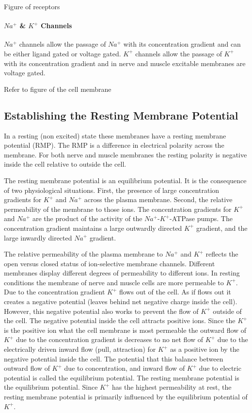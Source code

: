 Figure of receptors

\paragraph{$Na^+$ \& $K^+$ Channels}

$Na^+$ channels allow the passage of $Na^+$ with its concentration gradient and can be either ligand gated or voltage gated. $K^+$ channels allow the passage of $K^+$ with its concentration gradient and in nerve and muscle excitable membranes are voltage gated. 

Refer to figure of the cell membrane

\subsection{Establishing the Resting Membrane Potential}

In a resting (non excited) state these membranes have a resting membrane potential (RMP). The RMP is a difference in electrical polarity across the membrane. For both nerve and muscle membranes the resting polarity is negative inside the cell relative to outside the cell. 


The resting membrane potential is an equilibrium potential. It is the consequence of two physiological situations. First, the presence of large concentration gradients for $K^+$ and $Na^+$ across the plasma membrane. Second, the relative permeability of the membrane to those ions. The concentration gradients for $K^+$ and $Na^+$ are the product of the activity of the $Na^+$-$K^+$-ATPase pumps. The concentration gradient maintains a large outwardly directed $K^+$ gradient, and the large inwardly directed $Na^+$ gradient.

The relative permeability of the plasma membrane to $Na^+$ and $K^+$ reflects the open versus closed status of ion-selective membrane channels. Different membranes display different degrees of permeability to different ions. In resting conditions the membrane of nerve and muscle cells are more permeable to $K^+$. Due to the concentration gradient $K^+$ flows out of the cell. As if flows out it creates a negative potential (leaves behind net negative charge inside the cell). However, this negative potential also works to prevent the flow of $K^+$ outside of the cell. The negative potential inside the cell attracts positive ions. Since the $K^+$ is the positive ion what the cell membrane is most permeable the outward flow of $K^+$ due to the concentration gradient is decreases to no net flow of $K^+$ due to the electrically driven inward flow (pull, attraction) for $K^+$ as a positive ion by the negative potential inside the cell. The potential that this balance between outward flow of $K^+$ due to concentration, and inward flow of $K^+$ due to electric potential is called the equilibrium potential. The resting membrane potential is the equilibrium potential. Since $K^+$ has the highest permeability at rest, the resting membrane potential is primarily influenced by the equilibrium potential of $K^+$.

